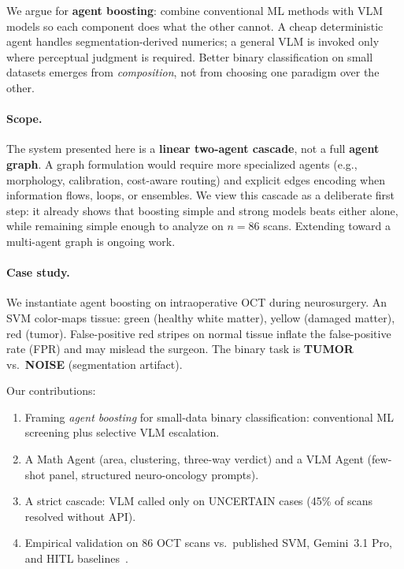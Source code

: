 \documentclass[11pt]{article}
\begin{document}
We argue for \textbf{agent boosting}: combine conventional ML methods with VLM models so each component does what the other cannot.
A cheap deterministic agent handles segmentation-derived numerics; a general VLM is invoked only where perceptual judgment is required.
Better binary classification on small datasets emerges from \emph{composition}, not from choosing one paradigm over the other.

\paragraph{Scope.}
The system presented here is a \textbf{linear two-agent cascade}, not a full \textbf{agent graph}.
A graph formulation would require more specialized agents (e.g., morphology, calibration, cost-aware routing) and explicit edges encoding when information flows, loops, or ensembles.
We view this cascade as a deliberate first step: it already shows that boosting simple and strong models beats either alone, while remaining simple enough to analyze on $n=86$ scans.
Extending toward a multi-agent graph is ongoing work.

\paragraph{Case study.}
We instantiate agent boosting on intraoperative OCT during neurosurgery.
An SVM color-maps tissue: green (healthy white matter), yellow (damaged matter), red (tumor).
False-positive red stripes on normal tissue inflate the false-positive rate (FPR) and may mislead the surgeon.
The binary task is \textbf{TUMOR} vs.\ \textbf{NOISE} (segmentation artifact).

Our contributions:
\begin{enumerate}[nosep]
  \item Framing \emph{agent boosting} for small-data binary classification: conventional ML screening plus selective VLM escalation.
  \item A Math Agent (area, clustering, three-way verdict) and a VLM Agent (few-shot panel, structured neuro-oncology prompts).
  \item A strict cascade: VLM called only on UNCERTAIN cases (45\% of scans resolved without API).
  \item Empirical validation on 86 OCT scans vs.\ published SVM, Gemini~3.1 Pro, and HITL baselines~\cite{mdpi2024}.
\end{enumerate}

\end{document}
